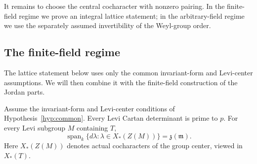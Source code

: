 It remains to choose the central cocharacter with nonzero pairing.
In the finite-field regime we prove an integral lattice statement;
in the arbitrary-field regime we use the separately assumed
invertibility of the Weyl-group order.

\subsection{The finite-field regime}

The lattice statement below uses only the common invariant-form and
Levi-center assumptions. We will then combine it with the finite-field
construction of the Jordan parts.

\begin{lemma}\label{lie:lattice}
Assume the invariant-form and Levi-center conditions of
Hypothesis~\ref{hyp:common}.  Every Levi Cartan determinant is prime
to $p$.  For every Levi subgroup $M$ containing $T$,
\begin{equation}\label{eq:central-span}
 \operatorname{span}_k\{d\lambda:
           \lambda\in X_*(Z(M))\}=\mathfrak z(\mathfrak m).
\end{equation}
Here $X_*(Z(M))$ denotes actual cocharacters of the group center,
viewed in $X_*(T)$.
\end{lemma}


